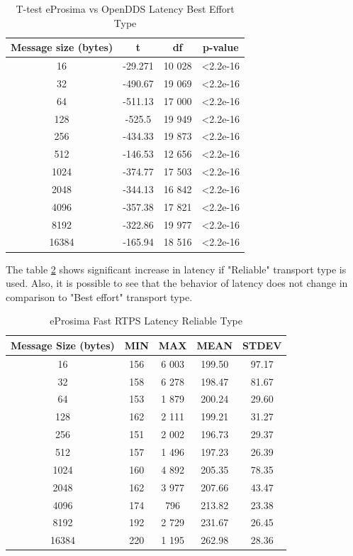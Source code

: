 \documentclass{csfourzero}
\begin{document}
\begin{table}[!ht]
	\centering
	\caption{T-test eProsima vs OpenDDS Latency Best Effort Type}
	\label{T-test-latency-table-best}
	\begin{tabular}{|c|c|c|c|}
		\hline 
		 Message size (bytes) & t & df & p-value \\ 
		\hline 
		16 & -29.271 & 10 028 & \textless 2.2e-16 \\ 
		\hline 
		32 & -490.67 & 19 069 & \textless 2.2e-16 \\ 
		\hline 
		64 & -511.13 & 17 000 & \textless 2.2e-16 \\ 
		\hline 
		128 & -525.5 & 19 949 & \textless 2.2e-16 \\ 
		\hline 
		256 & -434.33 & 19 873 & \textless 2.2e-16 \\ 
		\hline 
		512 & -146.53 & 12 656 & \textless 2.2e-16 \\ 
		\hline 
		1024 & -374.77 & 17 503 & \textless 2.2e-16 \\ 
		\hline 
		2048 & -344.13 & 16 842 & \textless 2.2e-16 \\ 
		\hline 
		4096 & -357.38 & 17 821 & \textless 2.2e-16 \\ 
		\hline 
		8192 & -322.86 & 19 977 & \textless 2.2e-16 \\ 
		\hline 
		16384 & -165.94 & 18 516 & \textless 2.2e-16 \\ 
		\hline 
	\end{tabular} 
\end{table}

The table \ref{eProima-latency-table-reliable} shows significant increase in latency if "Reliable" transport type is used. Also, it is possible to see that the behavior of latency does not change in comparison to "Best effort" transport type.

\begin{table}[!ht]
	\centering
	\caption{eProsima Fast RTPS Latency Reliable Type}
	\label{eProima-latency-table-reliable}
	\begin{tabular}{|c|c|c|c|c|}
		\hline 
		Message Size (bytes)& MIN & MAX & MEAN & STDEV \\ 
		\hline 
		16 & 156 & 6 003 & 199.50 & 97.17 \\ 
		\hline 
		32 & 158 & 6 278 & 198.47 & 81.67 \\ 
		\hline 
		64 & 153 & 1 879 & 200.24 & 29.60 \\ 
		\hline 
		128 & 162 & 2 111 & 199.21 & 31.27 \\ 
		\hline 
		256 & 151 & 2 002 & 196.73 & 29.37 \\ 
		\hline 
		512 & 157 & 1 496 & 197.23 & 26.39 \\ 
		\hline 
		1024 & 160 & 4 892 & 205.35 & 78.35 \\ 
		\hline 
		2048 & 162 & 3 977 & 207.66 & 43.47 \\ 
		\hline 
		4096 & 174 & 796 & 213.82 & 23.38 \\ 
		\hline 
		8192 & 192 & 2 729 & 231.67 & 26.45 \\ 
		\hline 
		16384 & 220 & 1 195 & 262.98 & 28.36 \\ 
		\hline 
	\end{tabular}
\end{table}
\end{document}
